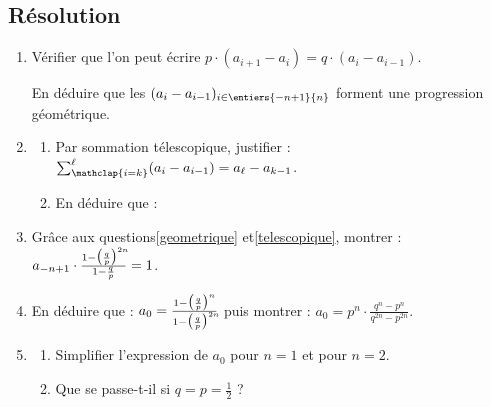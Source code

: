 \documentclass[12pt]{article}
\begin{document}
\subsection{Résolution}
\begin{enumerate}[resume]
  \item \label{geometrique}Vérifier que l'on peut écrire
    $p \cdot (a_{i+1} - a_i)
    =
    q \cdot (a_{i} - a_{i-1})$.

    En déduire que les $(a_{i} - a_{i-1})_{i\in\entiers{-n+1}{n}}$ forment une progression géométrique.
  \item
    \begin{enumerate}
      \item Par sommation télescopique, justifier : \quad
        \smash
        {%
          $\sum_{\mathclap{i=k}}^{\ell}(a_{i} - a_{i-1}) = a_{\ell} - a_{k-1}$.
        }%
      \item \label{telescopique}En déduire que : \quad
        \moinsLigne[2]
    \end{enumerate}
  \item Grâce aux questions\ref{geometrique} et\ref{telescopique}, montrer : \quad
    $a_{-n+1} \cdot
    \frac
    {%
      1-
      \big(\frac{q}{p}\big)^{2n\!\!}
    }%
    {%
      1-\frac{q}{p}
    }%
    =1
    $.
  \item En déduire que : \quad $a_0 =
    \frac
    {%
      1-
      \big(\frac{q}{p}\big)^{n}
    }%
    {%
      1-
      \big(\frac{q}{p}\big)^{2n\!\!}
    }%
    $ \quad  puis montrer : \quad
    $a_0 = p^{n} \cdot \frac{q^{n} - p^{n}}{q^{2n} - p^{2n}}$.
  \item 
    \begin{enumerate}
      \item Simplifier l'expression de $a_0$ pour $n=1$ et pour $n=2$.
      \item Que se passe-t-il si $q=p=\frac{1}{2}$ ?
    \end{enumerate}
\end{enumerate}
  
\end{document}

